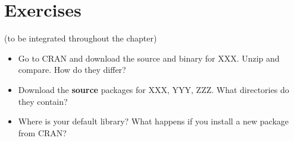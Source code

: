 \section{Exercises}

(to be integrated throughout the chapter)

\begin{itemize}
\item
  Go to CRAN and download the source and binary for XXX. Unzip and
  compare. How do they differ?
\item
  Download the \textbf{source} packages for XXX, YYY, ZZZ. What
  directories do they contain?
\item
  Where is your default library? What happens if you install a new
  package from CRAN?
\end{itemize}
